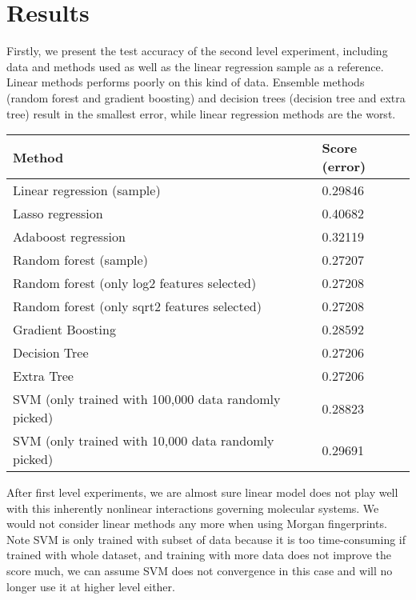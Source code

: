 \chapter{Results}

Firstly, we present the test accuracy of the second level experiment, including data and methods used as well as the linear regression sample as a reference. Linear methods performs poorly on this kind of data. Ensemble methods (random forest and gradient boosting) and decision trees (decision tree and extra tree) result in the smallest error, while linear regression methods are the worst.

\begin{center}
    \begin{tabular}{| l | l ||}
    \hline
    \textbf{Method} & \textbf{Score (error)} \\ \hline
    Linear regression (sample) & 0.29846 \\ \hline
    Lasso regression & 0.40682 \\ \hline
    Adaboost regression & 0.32119 \\ \hline
    Random forest (sample) & 0.27207 \\ \hline
    Random forest (only log2 features selected) & 0.27208 \\ \hline
    Random forest (only sqrt2 features selected) & 0.27208 \\ \hline
    Gradient Boosting & 0.28592 \\ \hline
    Decision Tree & 0.27206 \\ \hline
    Extra Tree & 0.27206 \\ \hline
    SVM (only trained with 100,000 data randomly picked) &  0.28823 \\ \hline
    SVM (only trained with 10,000 data randomly picked) & 0.29691 \\ \hline
    \hline
    \end{tabular}
\end{center}

After first level experiments, we are almost sure linear model does not play well with this inherently nonlinear interactions governing molecular systems. We would not consider linear methods any more when using Morgan fingerprints. Note SVM is only trained with subset of data because it is too time-consuming if trained with whole dataset, and training with more data does not improve the score much, we can assume SVM does not convergence in this case and will no longer use it at higher level either.

